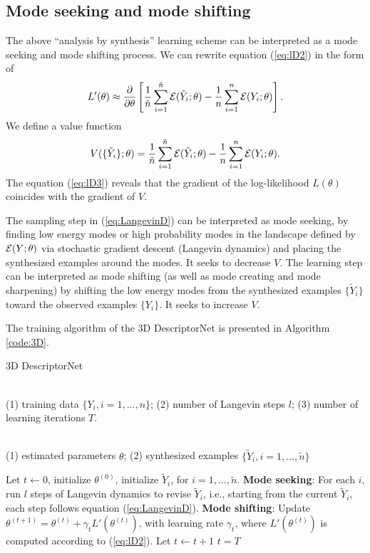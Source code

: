 \documentclass[10pt,twocolumn,letterpaper]{article}
\def\tY{\tilde{Y}}
\begin{document}
 
 \subsection{Mode seeking and mode shifting} 
 
The above ``analysis by synthesis'' learning scheme can be interpreted as a mode seeking and mode shifting process. We can rewrite equation (\ref{eq:lD2}) in the form of  
 \begin{eqnarray} 
  L'(\theta) \approx \frac{\partial}{\partial \theta} \left[ \frac{1}{\tilde{n}} \sum_{i=1}^{ \tilde{n} }   {\cal E}(\tilde Y_i; \theta) - \frac{1}{n} \sum_{i=1}^{n}   {\cal E}(Y_i; \theta) \right]. \label{eq:lD3}
\end{eqnarray}
We define a value function
 \begin{eqnarray} 
 V(\{\tY_i\}; \theta) = \frac{1}{\tilde{n}} \sum_{i=1}^{ \tilde{n} }   {\cal E}(\tilde Y_i; \theta) - \frac{1}{n} \sum_{i=1}^{n}   {\cal E}(Y_i; \theta). \label{eq:V}
\end{eqnarray}
The equation (\ref{eq:lD3}) reveals that the gradient of the log-likelihood $L{(\theta)}$ coincides with the gradient of $V$. 

The sampling step in (\ref{eq:LangevinD}) can be interpreted as mode seeking, by finding low energy modes or high probability modes in the landscape defined by $ {\cal E}(Y;\theta)$ via stochastic gradient descent (Langevin dynamics) and placing the synthesized examples around the modes. It seeks to decrease $V$.   The learning step can be interpreted as mode shifting (as well as mode creating and mode sharpening) by shifting the low energy modes from the synthesized examples $\{\tY_i\}$ toward the observed examples $\{Y_i\}$. It seeks to increase $V$. 


 
  The training algorithm of the 3D DescriptorNet is presented in Algorithm \ref{code:3D}.

\begin{algorithm}[h]
\caption{3D DescriptorNet}
\label{code:3D}
\begin{algorithmic}[1]
\REQUIRE ~~\\
(1) training data $\{Y_i, i=1,...,n\}$; (2) number of Langevin steps $l$; (3) number of learning iterations $T$.

\ENSURE~~\\
(1) estimated parameters $\theta$; (2) synthesized examples $\{\tY_i, i = 1, ..., \tilde{n}\}$ 

\item[] 
\STATE Let $t\leftarrow 0$, initialize $\theta^{(0)}$, initialize $\tY_i$, for $i = 1, ..., \tilde{n}$. 
\REPEAT 
\STATE \textbf{Mode seeking}: For each $i$, run $l$ steps of Langevin dynamics to revise $\tY_i$, i.e., starting from the current $\tY_i$, each step follows equation (\ref{eq:LangevinD}). 
\STATE \textbf{Mode shifting}: Update $\theta^{(t+1)} = \theta^{(t)} + \gamma_t L'(\theta^{(t)}) $,  with learning rate $\gamma_t$, where $L'(\theta^{(t)})$ is computed according to (\ref{eq:lD2}). 
\STATE Let $t \leftarrow t+1$
\UNTIL $t = T$
\end{algorithmic}
\end{algorithm}
\end{document}
